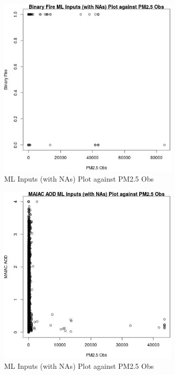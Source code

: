 \begin{figure} 
\centering  
\includegraphics[width=0.77\textwidth]{Code_Outputs/Report_ML_input_PM25_Step4_part_f_de_duplicated_aveswNAs_Binary_FirevPM25_Obs.jpg} 
\caption{\label{fig:Report_ML_input_PM25_Step4_part_f_de_duplicated_aveswNAsBinary_FirevPM25_Obs}ML Inputs (with NAs) Plot against PM2.5 Obs} 
\end{figure} 
 

\begin{figure} 
\centering  
\includegraphics[width=0.77\textwidth]{Code_Outputs/Report_ML_input_PM25_Step4_part_f_de_duplicated_aveswNAs_MAIAC_AODvPM25_Obs.jpg} 
\caption{\label{fig:Report_ML_input_PM25_Step4_part_f_de_duplicated_aveswNAsMAIAC_AODvPM25_Obs}ML Inputs (with NAs) Plot against PM2.5 Obs} 
\end{figure} 
 

